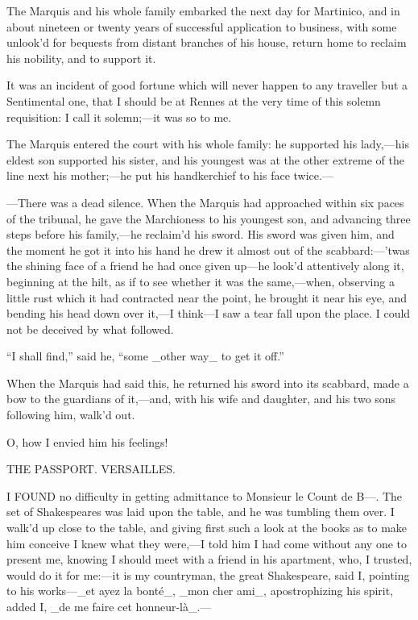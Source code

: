 \documentclass[twoside]{article}
\begin{document}
The Marquis and his whole family embarked the next day for Martinico,
and in about nineteen or twenty years of successful application to
business, with some unlook’d for bequests from distant branches of his
house, return home to reclaim his nobility, and to support it.

It was an incident of good fortune which will never happen to any
traveller but a Sentimental one, that I should be at Rennes at the very
time of this solemn requisition: I call it solemn;—it was so to me.

The Marquis entered the court with his whole family: he supported his
lady,—his eldest son supported his sister, and his youngest was at the
other extreme of the line next his mother;—he put his handkerchief to his
face twice.—

—There was a dead silence.  When the Marquis had approached within six
paces of the tribunal, he gave the Marchioness to his youngest son, and
advancing three steps before his family,—he reclaim’d his sword.  His
sword was given him, and the moment he got it into his hand he drew it
almost out of the scabbard:—’twas the shining face of a friend he had
once given up—he look’d attentively along it, beginning at the hilt, as
if to see whether it was the same,—when, observing a little rust which it
had contracted near the point, he brought it near his eye, and bending
his head down over it,—I think—I saw a tear fall upon the place.  I could
not be deceived by what followed.

“I shall find,” said he, “some _other way_ to get it off.”

When the Marquis had said this, he returned his sword into its scabbard,
made a bow to the guardians of it,—and, with his wife and daughter, and
his two sons following him, walk’d out.

O, how I envied him his feelings!




THE PASSPORT.
VERSAILLES.


I FOUND no difficulty in getting admittance to Monsieur le Count de B—.
The set of Shakespeares was laid upon the table, and he was tumbling them
over.  I walk’d up close to the table, and giving first such a look at
the books as to make him conceive I knew what they were,—I told him I had
come without any one to present me, knowing I should meet with a friend
in his apartment, who, I trusted, would do it for me:—it is my
countryman, the great Shakespeare, said I, pointing to his works—_et ayez
la bonté_, _mon cher ami_, apostrophizing his spirit, added I, _de me
faire cet honneur-là_.—
\end{document}
